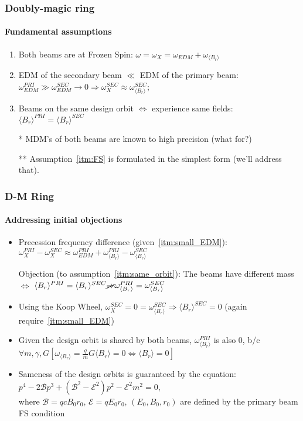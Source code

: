 \documentclass{beamer}
\newcommand{\w}{\omega}
\newcommand{\avg}[1]{\langle{#1}\rangle}
\begin{document}
\begin{frame}\frametitle{Doubly-magic ring}\framesubtitle{Fundamental assumptions}
  \begin{enumerate}
  \item Both beams are at Frozen Spin: $\w = \w_X = \w_{EDM} + \w_{\avg{B_r}}$\label{itm:FS}
  \item EDM of the secondary beam $\ll$ EDM of the primary beam:
    $\w_{EDM}^{PRI} \gg \w_{EDM}^{SEC}\rightarrow 0 \Rightarrow \w_X^{SEC} \approx \w_{\avg{B_r}}^{SEC}$;
    \label{itm:small_EDM}
  \item Beams on the same design orbit $\Leftrightarrow$ experience same fields:
    $\avg{B_r}^{PRI} = \avg{B_r}^{SEC}$\label{itm:same_orbit}
  \item[*] MDM's of both beams are known to high precision (what for?)
  \item[**] Assumption~\ref{itm:FS} is formulated in the simplest form
    (we'll address that).
  \end{enumerate}
\end{frame}
\begin{frame}\frametitle{D-M Ring}\framesubtitle{Addressing initial objections}
  \begin{itemize}
  \item Precession frequency difference (given~\ref{itm:small_EDM}):
    $\w_X^{PRI} - \w_X^{SEC} \approx \w_{EDM}^{PRI} + \w_{\avg{B_r}}^{PRI} - \w_{\avg{B_r}}^{SEC}$
  \item[Objection] (to assumption~\ref{itm:same_orbit}): The beams have different mass $\Leftrightarrow$
    $\avg{B_r}^{PRI} = \avg{B_r}^{SEC} \cancel{\Rightarrow}\w_{\avg{B_r}}^{PRI} = \w_{\avg{B_r}}^{SEC}$
  \item Using the Koop Wheel, $\w_X^{SEC} = 0 = \w_{\avg{B_r}}^{SEC} \Rightarrow \avg{B_r}^{SEC} = 0$
    (again require~\ref{itm:small_EDM})
  \item Given the design orbit is shared by both beams, $\w_{\avg{B_r}}^{PRI}$ is also 0, b/c
    $\forall m,\gamma,G\left[\w_{\avg{B_r}}=\frac qm G\avg{B_r} = 0\Leftrightarrow \avg{B_r}=0\right]$
  \item Sameness of the design orbits is guaranteed by the equation:
    $p^4 - 2\mathcal B p^3 + (\mathcal B^2-\mathcal E^2)p^2 - \mathcal E^2m^2 = 0$,\\ where
    $\mathcal B=qcB_0r_0$, $\mathcal E=qE_0r_0$, $(E_0, B_0, r_0)$ are defined by the primary beam FS condition
  \end{itemize}
\end{frame}
\end{document}
